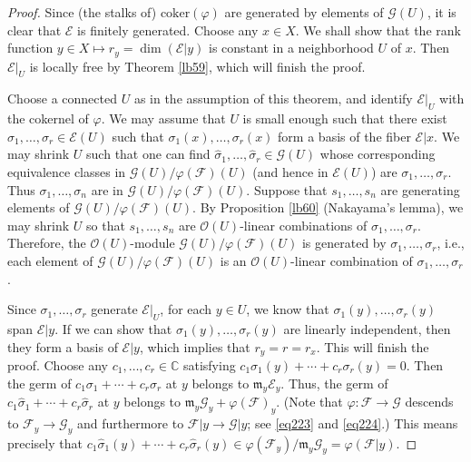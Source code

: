 \documentclass[12pt,a4paper,notitlepage]{report}
\theoremstyle{definition}
\theoremstyle{plain}
\newcommand{\fk}{\mathfrak}
\newcommand{\wht}{\widehat}
\newcommand{\scr}{\mathscr}
\newcommand{\coker}{\mathrm{coker}}
\newcommand{\Cbb}{\mathbb C}
\numberwithin{equation}{section}
\begin{document}
\begin{proof}
Since (the stalks of) $\coker(\varphi)$ are generated by elements of $\scr G(U)$, it is clear that $\scr E$ is finitely generated. Choose any $x\in X$. We shall show that the rank function $y\in X\mapsto r_y=\dim(\scr E|y)$ is  constant in a neighborhood $U$ of $x$. Then $\scr E|_U$ is locally free by Theorem \ref{lb59}, which will finish the proof.

Choose a connected $U$ as in the assumption of this theorem, and identify $\scr E|_U$ with the cokernel of $\varphi$.   We may assume that $U$ is small enough such that there exist $\sigma_1,\dots,\sigma_r\in\scr E(U)$ such that $\sigma_1(x),\dots,\sigma_r(x)$ form a basis of the fiber $\scr E|x$. We may shrink $U$ such that one can find $\wht\sigma_1,\dots,\wht\sigma_r\in\scr G(U)$ whose corresponding equivalence classes in $\scr G(U)/\varphi(\scr F)(U)$ (and hence in $\scr E(U)$) are $\sigma_1,\dots,\sigma_r$. Thus $\sigma_1,\dots,\sigma_n$ are in $\scr G(U)/\varphi(\scr F)(U)$. Suppose that $s_1,\dots,s_n$ are generating elements of $\scr G(U)/\varphi(\scr F)(U)$. By Proposition \ref{lb60} (Nakayama's lemma), we may shrink $U$ so that $s_1,\dots,s_n$ are $\scr O(U)$-linear combinations of $\sigma_1,\dots,\sigma_r$. Therefore, the $\scr O(U)$-module $\scr G(U)/\varphi(\scr F)(U)$ is generated by $\sigma_1,\dots,\sigma_r$, i.e., each element of $\scr G(U)/\varphi(\scr F)(U)$ is an $\scr O(U)$-linear combination of $\sigma_1,\dots,\sigma_r$.

Since $\sigma_1,\dots,\sigma_r$ generate   $\scr E|_U$, for each $y\in U$, we know that $\sigma_1(y),\dots,\sigma_r(y)$ span $\scr E|y$. If we can show that $\sigma_1(y),\dots,\sigma_r(y)$ are linearly independent, then they form a basis of $\scr E|y$, which implies that $r_y=r=r_x$. This will finish the proof. Choose any $c_1,\dots,c_r\in\Cbb$ satisfying  $c_1\sigma_1(y)+\cdots+c_r\sigma_r(y)=0$. Then the germ of $c_1\sigma_1+\cdots+c_r\sigma_r$ at $y$ belongs to $\fk m_y\scr E_y$. Thus, the germ of $c_1\wht \sigma_1+\cdots+c_r\wht \sigma_r$ at $y$ belongs to $\fk m_y\scr G_y+\varphi(\scr F)_y$. (Note that $\varphi:\scr F\rightarrow\scr G$ descends to $\scr F_y\rightarrow \scr G_y$ and furthermore to $\scr F|y\rightarrow\scr G|y$; see \eqref{eq223} and \eqref{eq224}.) This means precisely that $c_1\wht \sigma_1(y)+\cdots+c_r\wht \sigma_r(y)\in\varphi(\scr F_y)/\fk m_y\scr G_y=\varphi(\scr F|y)$. 


\end{proof}
\end{document}
